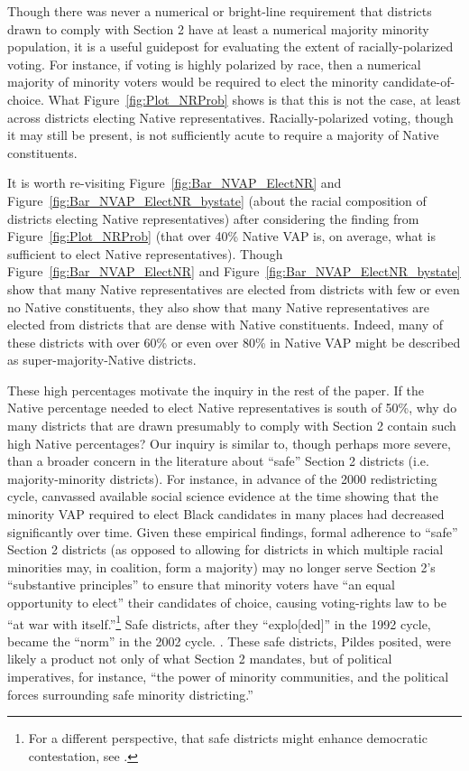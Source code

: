 \documentclass[12pt]{article}
\begin{document}
Though there was never a numerical or bright-line requirement that districts drawn to comply with Section 2 have at least a numerical majority minority population, it is a useful guidepost for evaluating the extent of racially-polarized voting. For instance, if voting is highly polarized by race, then a numerical majority of minority voters would be required to elect the minority candidate-of-choice.  What Figure~\ref{fig:Plot_NRProb} shows is that this is not the case, at least across districts electing Native representatives.  Racially-polarized voting, though it may still be present, is not sufficiently acute to require a majority of Native constituents.

It is worth re-visiting Figure~\ref{fig:Bar_NVAP_ElectNR} and Figure~\ref{fig:Bar_NVAP_ElectNR_bystate} (about the racial composition of districts electing Native representatives) after considering the finding from Figure~\ref{fig:Plot_NRProb} (that over 40\% Native VAP is, on average, what is sufficient to elect Native representatives). Though Figure~\ref{fig:Bar_NVAP_ElectNR} and Figure~\ref{fig:Bar_NVAP_ElectNR_bystate} show that many Native representatives are elected from districts with few or even no Native constituents, they also show that many Native representatives are elected from districts that are dense with Native constituents.  Indeed, many of these districts with over 60\% or even over 80\% in Native VAP might be described as super-majority-Native districts.

These high percentages motivate the inquiry in the rest of the paper. If the Native percentage needed to elect Native representatives is south of 50\%, why do many districts that are drawn presumably to comply with Section 2 contain such high Native percentages? Our inquiry is similar to, though perhaps more severe, than a broader concern in the literature about ``safe'' Section 2 districts (i.e. majority-minority districts).  For instance, in advance of the 2000 redistricting cycle, \cite{pildes2001voting} canvassed available social science evidence at the time showing that the minority VAP required to elect Black candidates in many places had decreased significantly over time.  Given these empirical findings, formal adherence to ``safe'' Section 2 districts (as opposed to allowing for districts in which multiple racial minorities may, in coalition, form a majority) may no longer serve Section 2's ``substantive principles'' to ensure that minority voters have ``an equal opportunity to elect'' their candidates of choice, causing voting-rights law to be ``at war with itself.''\footnote{For a different perspective, that safe districts might enhance democratic contestation, see \cite{kang2007race}.} Safe districts, after they ``explo[ded]'' in the 1992 cycle, became the ``norm'' in the 2002 cycle.  \cite{pildes2007decline}. These safe districts, Pildes posited, were likely a product not only of what Section 2 mandates, but of political imperatives, for instance, ``the power of minority communities, and the political forces surrounding safe minority districting.'' 
\end{document}
